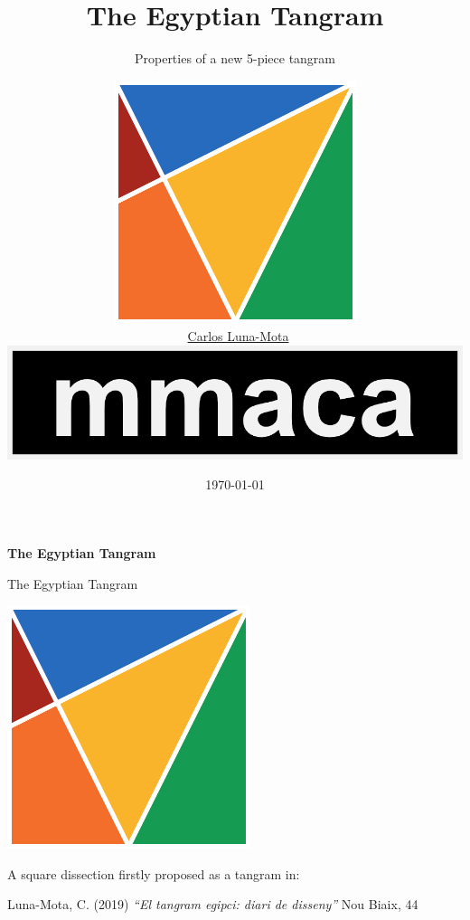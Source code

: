 \documentclass[14pt]{beamer}
\title{The Egyptian Tangram}
\subtitle{Properties of a new 5-piece tangram\vspace{-1.0em}}
\author{
    \includegraphics[height=15ex]{figures/figure001a.pdf}\\
    \vspace{0.75em}
    {\small \textcopyright\ \href{https://github.com/CarlosLunaMota}{Carlos Luna-Mota}}\\
    \vspace{0.75em}
    \href{https://mmaca.cat/}{\includegraphics[width=10ex]{figures/logo.png}}\\
    \vspace{-1.75em}}
\date{\today}
\begin{document}

    \begin{frame}
      \titlepage
    \end{frame}


    \begin{frame}{}
        \begin{center}
            \textbf{\huge The Egyptian Tangram}
        \end{center}
    \end{frame}


    \begin{frame}{The Egyptian Tangram}
        \begin{center}
            \includegraphics[height=20ex]{figures/figure001a.pdf} \\

            \bigskip

            A square dissection firstly proposed as a tangram in:

            \bigskip

            {\footnotesize Luna-Mota, C. (2019) \emph{``El tangram egipci: diari de disseny''} Nou Biaix, 44}
        \end{center}
    \end{frame}

\end{document}

